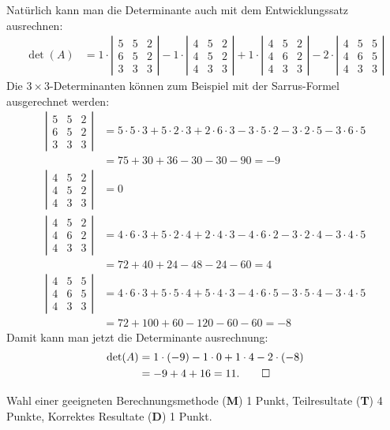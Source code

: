 \begin{loesung}
Natürlich kann man die Determinante auch mit dem Entwicklungssatz ausrechnen:
\begin{align*}
\det(A)
&=
1\cdot\left|\begin{matrix}
5&5&2\\
6&5&2\\
3&3&3
\end{matrix}\right|
-
1\cdot\left|\begin{matrix}
4&5&2\\
4&5&2\\
4&3&3
\end{matrix}\right|
+
1\cdot\left|\begin{matrix}
4&5&2\\
4&6&2\\
4&3&3
\end{matrix}\right|
-
2\cdot\left|\begin{matrix}
4&5&5\\
4&6&5\\
4&3&3
\end{matrix}\right|
\end{align*}
Die $3\times 3$-Determinanten können zum Beispiel mit der Sarrus-Formel
ausgerechnet werden:
\begin{align*}
\left|\begin{matrix}
5&5&2\\
6&5&2\\
3&3&3
\end{matrix}\right|
&=
5\cdot 5\cdot 3 + 5\cdot 2 \cdot3 + 2\cdot 6\cdot 3
-3\cdot 5\cdot 2-3\cdot 2\cdot 5-3\cdot 6\cdot5
\\
&=
75+30+36-30-30-90=-9
\\
\left|\begin{matrix}
4&5&2\\
4&5&2\\
4&3&3
\end{matrix}\right|
&=0
\\
\left|\begin{matrix}
4&5&2\\
4&6&2\\
4&3&3
\end{matrix}\right|
&=
4\cdot 6\cdot 3 + 5\cdot 2\cdot4+2\cdot 4\cdot 3
-4\cdot 6\cdot 2-3\cdot 2\cdot 4-3\cdot 4\cdot 5
\\
&=72+40+24-48-24-60=4
\\
\left|\begin{matrix}
4&5&5\\
4&6&5\\
4&3&3
\end{matrix}\right|
&=
4\cdot 6\cdot 3+5\cdot 5\cdot 4 +5\cdot 4\cdot 3
-4\cdot 6\cdot 5-3\cdot 5\cdot 4-3\cdot 4\cdot 5
\\
&= 72+100+60-120-60-60
=-8
\end{align*}
Damit kann man jetzt die  Determinante ausrechnung:
\begin{align*}
\det(A)
&=
1\cdot (-9)
-1\cdot 0
+1\cdot 4
-2\cdot (-8)
\\
&=-9+4+16=11.
\qedhere
\end{align*}
\end{loesung}

\begin{bewertung}
Wahl einer geeigneten Berechnungsmethode ({\bf M}) 1 Punkt,
Teilresultate ({\bf T}) 4 Punkte,
Korrektes Resultate ({\bf D}) 1 Punkt.
\end{bewertung}
